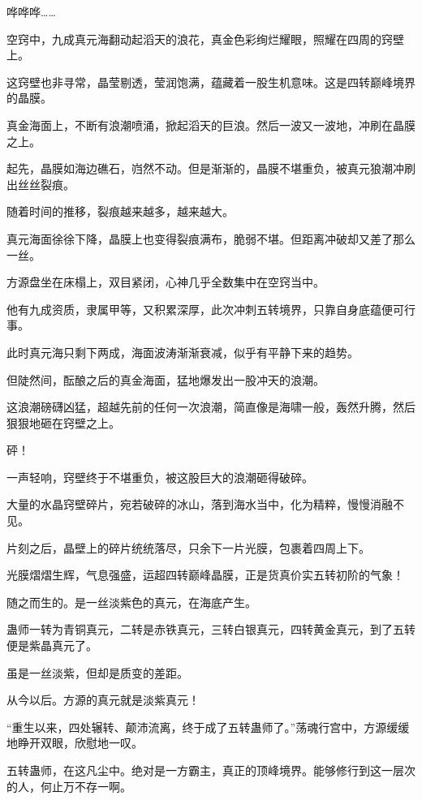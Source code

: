 
\begin{this_body}



哗哗哗……

空窍中，九成真元海翻动起滔天的浪花，真金色彩绚烂耀眼，照耀在四周的窍壁上。

这窍壁也非寻常，晶莹剔透，莹润饱满，蕴藏着一股生机意味。这是四转巅峰境界的晶膜。

真金海面上，不断有浪潮喷涌，掀起滔天的巨浪。然后一波又一波地，冲刷在晶膜之上。

起先，晶膜如海边礁石，岿然不动。但是渐渐的，晶膜不堪重负，被真元狼潮冲刷出丝丝裂痕。

随着时间的推移，裂痕越来越多，越来越大。

真元海面徐徐下降，晶膜上也变得裂痕满布，脆弱不堪。但距离冲破却又差了那么一丝。

方源盘坐在床榻上，双目紧闭，心神几乎全数集中在空窍当中。

他有九成资质，隶属甲等，又积累深厚，此次冲刺五转境界，只靠自身底蕴便可行事。

此时真元海只剩下两成，海面波涛渐渐衰减，似乎有平静下来的趋势。

但陡然间，酝酿之后的真金海面，猛地爆发出一股冲天的浪潮。

这浪潮磅礴凶猛，超越先前的任何一次浪潮，简直像是海啸一般，轰然升腾，然后狠狠地砸在窍壁之上。

砰！

一声轻响，窍壁终于不堪重负，被这股巨大的浪潮砸得破碎。

大量的水晶窍壁碎片，宛若破碎的冰山，落到海水当中，化为精粹，慢慢消融不见。

片刻之后，晶壁上的碎片统统落尽，只余下一片光膜，包裹着四周上下。

光膜熠熠生辉，气息强盛，运超四转巅峰晶膜，正是货真价实五转初阶的气象！

随之而生的。是一丝淡紫色的真元，在海底产生。

蛊师一转为青铜真元，二转是赤铁真元，三转白银真元，四转黄金真元，到了五转便是紫晶真元了。

虽是一丝淡紫，但却是质变的差距。

从今以后。方源的真元就是淡紫真元！

“重生以来，四处辗转、颠沛流离，终于成了五转蛊师了。”荡魂行宫中，方源缓缓地睁开双眼，欣慰地一叹。

五转蛊师，在这凡尘中。绝对是一方霸主，真正的顶峰境界。能够修行到这一层次的人，何止万不存一啊。


\end{this_body}
